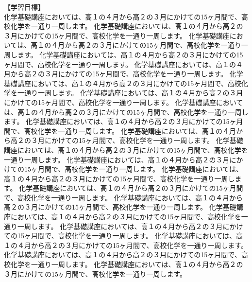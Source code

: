 \documentclass[book, twoside, paper=b5j, fleqn, jafontsize=9pt, jafontscale=1, head_space=22mm, foot_space=9mm, fore-edge=16mm, gutter=25mm, hanging_punctuation]{jlreq}
\newcommand{\aboutsection}[1]{\noindent 【#1】\\}
\begin{document}
\begin{multicols*}{2}
    \aboutsection{学習目標}
    \indent 化学基礎講座においては、高１の４月から高２の３月にかけての15ヶ月間で、高校化学を一通り一周します。
    \indent 化学基礎講座においては、高１の４月から高２の３月にかけての15ヶ月間で、高校化学を一通り一周します。
    \indent 化学基礎講座においては、高１の４月から高２の３月にかけての15ヶ月間で、高校化学を一通り一周します。
    \indent 化学基礎講座においては、高１の４月から高２の３月にかけての15ヶ月間で、高校化学を一通り一周します。
    \indent 化学基礎講座においては、高１の４月から高２の３月にかけての15ヶ月間で、高校化学を一通り一周します。
    \indent 化学基礎講座においては、高１の４月から高２の３月にかけての15ヶ月間で、高校化学を一通り一周します。
    \indent 化学基礎講座においては、高１の４月から高２の３月にかけての15ヶ月間で、高校化学を一通り一周します。
    \indent 化学基礎講座においては、高１の４月から高２の３月にかけての15ヶ月間で、高校化学を一通り一周します。
    \indent 化学基礎講座においては、高１の４月から高２の３月にかけての15ヶ月間で、高校化学を一通り一周します。
    \indent 化学基礎講座においては、高１の４月から高２の３月にかけての15ヶ月間で、高校化学を一通り一周します。
    \indent 化学基礎講座においては、高１の４月から高２の３月にかけての15ヶ月間で、高校化学を一通り一周します。
    \indent 化学基礎講座においては、高１の４月から高２の３月にかけての15ヶ月間で、高校化学を一通り一周します。
    \indent 化学基礎講座においては、高１の４月から高２の３月にかけての15ヶ月間で、高校化学を一通り一周します。
    \indent 化学基礎講座においては、高１の４月から高２の３月にかけての15ヶ月間で、高校化学を一通り一周します。
    \indent 化学基礎講座においては、高１の４月から高２の３月にかけての15ヶ月間で、高校化学を一通り一周します。
    \indent 化学基礎講座においては、高１の４月から高２の３月にかけての15ヶ月間で、高校化学を一通り一周します。
    \indent 化学基礎講座においては、高１の４月から高２の３月にかけての15ヶ月間で、高校化学を一通り一周します。
    \indent 化学基礎講座においては、高１の４月から高２の３月にかけての15ヶ月間で、高校化学を一通り一周します。
    \indent 化学基礎講座においては、高１の４月から高２の３月にかけての15ヶ月間で、高校化学を一通り一周します。
    \indent 化学基礎講座においては、高１の４月から高２の３月にかけての15ヶ月間で、高校化学を一通り一周します。
\end{multicols*}
\end{document}
